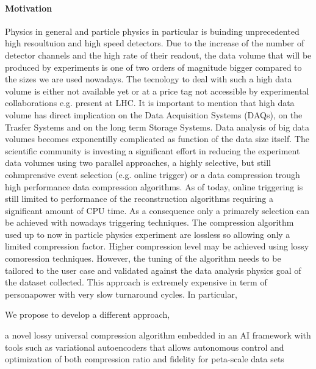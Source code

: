 \paragraph{Motivation}

Physics in general and particle physics in particular is buinding unprecedented high resoultuion and high speed detectors. 
Due to the increase of the number of detector channels and the high rate of their readout, the data volume that will be produced by experiments is one of two orders of magnitude bigger compared to the sizes we are used nowadays. The tecnology to deal with such a high data volume is either not available yet or at a price tag not accessible by experimental collaborations e.g. present at LHC. It is important to mention that high data volume has direct implication on the Data Acquisition Systems (DAQs), on the Trasfer Systems and on the long term Storage Systems. Data analysis of big data volumes becomes exponentilly complicated as function of the data size itself. The scientific community is investing a significant effort in reducing the experiment data volumes using two parallel approaches, a highly selective, but still cohmprensive event selection (e.g. online trigger) or a data compression trough high performance data compression algorithms. 
As of today, online triggering is still limited to performance of the reconstruction algorithms requiring a significant amount of CPU time. As a consequence only a primarely selection can be achieved with nowadays triggering techniques. The compression algorithm used up to now in particle physics experiment are lossless so allowing only a limited compression factor. Higher compression level may be achieved using lossy comoression techniques. However, the tuning of the algorithm needs to be tailored to the user case and validated against the data analysis physics goal of the dataset collected. This approach is extremely expensive in term of personapower with very slow turnaround cycles. In particular,  

We propose to develop a different  approach,



a novel lossy universal compression algorithm embedded in an AI framework with tools such as variational autoencoders that allows autonomous control and optimization of both compression ratio and fidelity for peta-scale data sets

